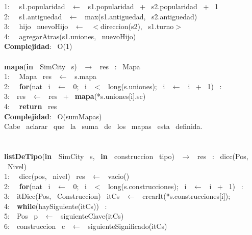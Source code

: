 \begin{Algoritmos}
    1: \  \ s1.popularidad \ $\leftarrow$ \ s1.popularidad \ + \ s2.popularidad \ + \ 1\\
    2: \  \ s1.antiguedad \ $\leftarrow$ \ max(s1.antiguedad, \ s2.antiguedad)\\
    3: \  \ hijo \ nuevoHijo \ $\leftarrow$ \ $<$direccion(s2), \ s1.turno$>$\\
    4: \  \ agregarAtras(s1.uniones, \ nuevoHijo)\\
    \textbf{Complejidad}: \ O(1)\\
    \makebox[\linewidth]{\rule{\textwidth}{0.4pt}}
    \\
    \makebox[\linewidth]{\rule{\textwidth}{0.4pt}}
    \textbf{mapa}(\textbf{in \ }SimCity \ s) \ $\rightarrow $ \ res \ : \ Mapa \ \\
    1: \  \ Mapa \ res \ $\leftarrow$ \ s.mapa\\
    2: \  \ \textbf{for}(nat \ i \ $\leftarrow$ \ 0; \ i \ $<$ \ long(s.uniones); \ i \ $\leftarrow$ \ i \ + \ 1) \ : \ \\
    3:\indent  \  \ res \ $\leftarrow$ \ res \ + \ \textbf{mapa}(*s.uniones[i].sc)\\
    4: \  \ \textbf{return} \ res\\
    \textbf{Complejidad}: \ O(sumMapas) \ \\
    Cabe \ aclarar \ que \ la \ suma \ de \ los \ mapas \ esta \ definida.\\
    \makebox[\linewidth]{\rule{\textwidth}{0.4pt}}
    \\
    \pagebreak\\
    \makebox[\linewidth]{\rule{\textwidth}{0.4pt}}
    \textbf{listDeTipo}(\textbf{in \ }SimCity \ s, \ \textbf{in \ }construccion \ tipo) \ $\rightarrow $ \ res \ : \ dicc(Pos, \ Nivel)\\
    1: \  \ dicc(pos, \ nivel) \ res \ $\leftarrow$ \ vacio()\\
    2: \  \ \textbf{for}(nat \ i \ $\leftarrow$ \ 0; \ i \ $<$ \ long(s.construcciones); \ i \ $\leftarrow$ \ i \ + \ 1) \ : \ \\
    3:\indent  \  \ itDicc(Pos, \ Construccion) \ itCs \ $\leftarrow$ \ crearIt(*s.construcciones[i]);\\
    4:\indent  \  \ \textbf{while}(haySiguiente(itCs)) \ :\\
    5:\indent \indent  \  \ Pos \ p \ $\leftarrow$ \ siguienteClave(itCs)\\
    6:\indent \indent  \  \ construccion \ c \ $\leftarrow$ \ siguienteSignificado(itCs)\\

\end{Algoritmos}
